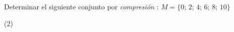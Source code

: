 \item{Determinar el siguiente conjunto por \emph{compresión} : $M = \{0;\,2;\,4;\,6;\,8;\,10\}$
\begin{tasks}(2)
\end{tasks}
}